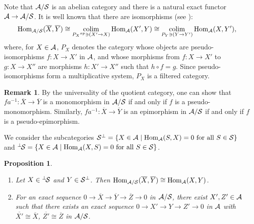 \documentclass[11pt]{amsart}
\newtheorem{proposition}[theorem]{Proposition}
\theoremstyle{definition}
\newtheorem{remark}[theorem]{Remark}
\numberwithin{equation}{section}
\begin{document}
Note that $\AA/ \SS$ is an abelian category and there is a natural exact functor $\AA \to \AA /\SS$. 
It is well known that there are isomorphisms (see \cite[Remark 7.1.17(ii)]{KS}):
$$
\HomAS (\overline{X}, \overline{Y}) \cong \colim_{{P_X}^{op} \ni (X' \to X)} \Hom_{\AA} (X', Y)\cong \colim_{ P_Y \ni (Y \to Y')} \Hom_{\AA} (X, Y'),  
$$ 
where, for $X \in \AA$, $P_X$ denotes the category whose objects are pseudo-isomorphisms $f:X\longrightarrow X'$ in $\AA$, and whose morphisms from $f : X\to X'$ to $g: X \to X''$ are morphisms $h: X' \to X''$ such that $h\circ f=g$.
Since pseudo-isomorphisms form a multiplicative system, $P_X$ is a filtered category.  


\begin{remark}\label{A3}
By the universality of the quotient category, one can show that $f a^{-1}: \overline{X} \to \overline{Y}$ is a monomorphism in $\AA / \SS$ if and only if $f$ is a pseudo-monomorphism. 
Similarly, $f a^{-1}: \overline{X} \to \overline{Y}$ is an epimorphism in $\AA / \SS$ if and only if $f$ is a pseudo-epimorphism. 
\end{remark}


We consider the subcategories $\SS ^{\perp} = \{ X \in \AA \mid  \HomA (S, X) = 0 \ \text{for all } S \in \SS \}$ and ${}^{\perp}\!\SS  = \{ X \in \AA \mid  \HomA (X, S) = 0 \ \text{for all } S \in \SS \}$. 


\begin{proposition}\label{A2}
\begin{enumerate}[\rm(1)]
\item Let $X \in {}^{\perp}\! \SS$ and $Y \in \SS ^{\perp}$. Then $\HomAS (\overline{X}, \overline{Y}) \cong \HomA (X, Y)$. 
\item For an exact sequence $0 \to \overline{X} \to \overline{Y} \to \overline{Z} \to 0$ in $\AA / \SS$, there exist $X' , Z' \in \AA$ such that there exists an exact sequence $0 \to X' \to Y \to Z' \to 0$ in $\AA$ with $\overline{X'} \cong \overline{X}$, $\overline{Z'} \cong \overline{Z}$ in $\AA/\SS$. 
\end{enumerate}
\end{proposition}
\end{document}
